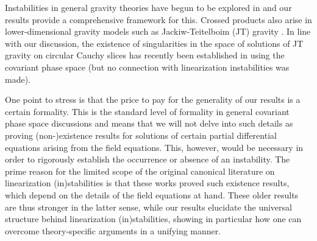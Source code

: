 \documentclass[]{jkpaper}
\theoremstyle{plain}
\theoremstyle{definition}
\begin{document}
Instabilities in general gravity theories have begun to be explored in \cite{Altas:2017fcp,Altas:2018dci} and our results  provide a comprehensive framework for this. Crossed products also arise in lower-dimensional gravity models such as Jackiw-Teitelboim (JT) gravity \cite{Penington:2023dql,Kolchmeyer:2023gwa}. In line with our discussion, the existence of singularities in the space of solutions of JT gravity on circular Cauchy slices has recently been established in \cite{Alonso-Monsalve:2024oii} using the covariant phase space (but no connection with linearization instabilities was made).

One point to stress is that the price to pay for the generality of our results is a certain formality. This is the standard level of formality in general covariant phase space discussions and means that we will not delve into such details as proving (non-)existence results for solutions of certain partial differential equations arising from the field equations. This, however, would be necessary in order to rigorously establish the occurrence or absence of an instability. The prime reason for the limited scope of the original canonical literature on linearization (in)stabilities \cite{Moncrief1,Moncrief:1976un,fischer1980structure,Arms:1982ea,Arms1,Arms:1979au,Saraykar:1981qm,Saraykar2,Marsden_lectures,Deser:1973zzb,choquet1979maximal} is that these works proved such existence results, which depend on the details of the field equations at hand. These older results are thus stronger in the latter sense, while our results elucidate the universal structure behind linearization (in)stabilities, showing in particular how one can overcome theory-specific arguments in a unifying manner. 
\end{document}
